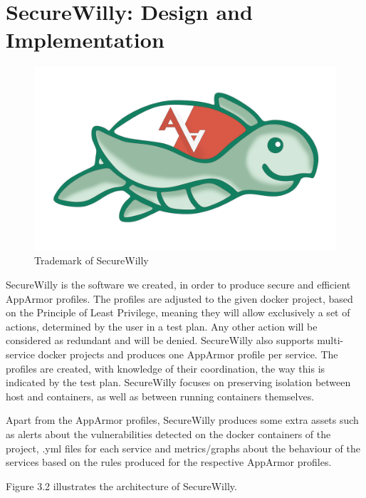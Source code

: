 \chapter{SecureWilly: Design and Implementation}
\begin{figure}[h!]
   \centering
   \includegraphics[width=0.45\linewidth]{figures/trt.png}
   \caption{Trademark of SecureWilly}
\end{figure}

SecureWilly is the software we created, in order to produce secure and efficient AppArmor profiles. The profiles are adjusted to the given docker project, based on the Principle of Least Privilege, meaning they will allow exclusively a set of actions, determined by the user in a test plan. Any other action will be considered as redundant and will be denied. SecureWilly also supports multi-service docker projects and produces one AppArmor profile per service. The profiles are created, with knowledge of their coordination, the way this is indicated by the test plan. SecureWilly focuses on preserving isolation between host and containers, as well as between running containers themselves.

Apart from the AppArmor profiles, SecureWilly produces some extra assets such as alerts about the vulnerabilities detected on the docker containers of the project, .yml files for each service and metrics/graphs about the behaviour of the services based on the rules produced for the respective AppArmor profiles. 

Figure 3.2 illustrates the architecture of SecureWilly.


